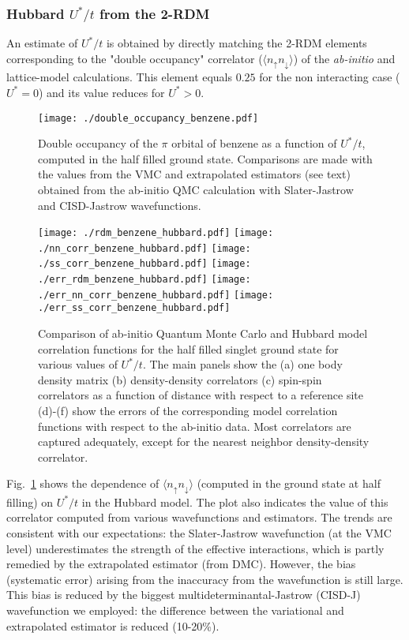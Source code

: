 \documentclass[aip,jcp,twocolumn,10pt]{revtex4-1}
\begin{document}
\subsubsection{Hubbard $U^{*}/t$ from the 2-RDM}
An estimate of $U^{*}/t$ is obtained 
by directly matching the 2-RDM elements corresponding 
to the "double occupancy" correlator ($\langle n_{\uparrow} n_{\downarrow} \rangle$) 
of the \emph{ab-initio} and lattice-model calculations. This element equals $0.25$ 
for the non interacting case ($U^{*}=0$) and its value reduces for $U^{*}>0$.

\begin{figure}[htpb]
\centering
\texttt{[image: ./double\_occupancy\_benzene.pdf]}
\caption{Double occupancy of the $\pi$ orbital of benzene 
as a function of $U^{*}/t$, computed in the half filled ground state. 
Comparisons are made with the values from the VMC and extrapolated estimators (see text) 
obtained from the ab-initio QMC calculation with Slater-Jastrow and CISD-Jastrow wavefunctions.}
\label{fig:rdm_benzene} 
\end{figure}	

\begin{figure*}[htpb]
\centering
\texttt{[image: ./rdm\_benzene\_hubbard.pdf]}
\texttt{[image: ./nn\_corr\_benzene\_hubbard.pdf]}
\texttt{[image: ./ss\_corr\_benzene\_hubbard.pdf]}
\texttt{[image: ./err\_rdm\_benzene\_hubbard.pdf]}
\texttt{[image: ./err\_nn\_corr\_benzene\_hubbard.pdf]}
\texttt{[image: ./err\_ss\_corr\_benzene\_hubbard.pdf]}
\caption{Comparison of ab-initio Quantum Monte Carlo 
and Hubbard model correlation functions for 
the half filled singlet ground state for various values of $U^{*}/t$. 
The main panels show the  
(a) one body density matrix (b) density-density correlators 
(c) spin-spin correlators as a function of distance with respect to a
reference site (d)-(f) show the errors of the corresponding model 
correlation functions with respect to the ab-initio data. Most correlators are captured 
adequately, except for the nearest neighbor density-density correlator.} 
\label{fig:HubbardU_benzene}
\end{figure*}	

Fig.~\ref{fig:rdm_benzene} shows the dependence of 
$\langle n_{\uparrow} n_{\downarrow} \rangle$ (computed in the ground state at half filling) 
on $U^{*}/t$ in the Hubbard model. The plot also indicates
the value of this correlator computed from various wavefunctions and estimators. 
The trends are consistent with our expectations: 
the Slater-Jastrow wavefunction (at the VMC level) underestimates 
the strength of the effective interactions, which is partly remedied by 
the extrapolated estimator (from DMC). However, the bias (systematic error) 
arising from the inaccuracy from the wavefunction is still large. 
This bias is reduced by the biggest multideterminantal-Jastrow 
(CISD-J) wavefunction we employed: the difference between the 
variational and extrapolated estimator is reduced (10-20\%). 
\end{document}
